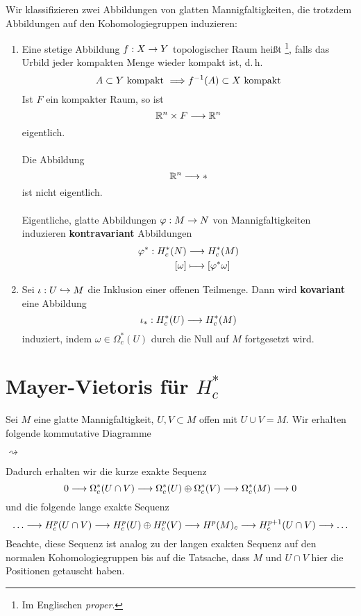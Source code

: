 \Bem{}
Wir klassifizieren zwei Abbildungen von glatten Mannigfaltigkeiten, die trotzdem Abbildungen auf den Kohomologiegruppen induzieren:
\begin{enumerate}[1)]
	\item \Def{}
	Eine stetige Abbildung $f : X \overset{}{\rightarrow} Y$ topologischer Raum heißt \footnote{Im Englischen \textit{proper}.}, falls das Urbild jeder kompakten Menge wieder kompakt ist, d.\,h.
	\[ A \subset Y \text{ kompakt } \overset{}{\Longrightarrow} f^{-1}(A)  \subset X\text{ kompakt} \]
	\Bsp{}
	Ist $F$ ein kompakter Raum, so ist
	\[ \mathbb{R}^n\times F \overset{}{\longrightarrow} \mathbb{R}^n \]
	eigentlich.\\\\
	Die Abbildung
	\[\mathbb{R}^n \overset{}{\longrightarrow} \ast \]
	ist nicht eigentlich.\\\\
	Eigentliche, glatte Abbildungen $\varphi : M\overset{}{\rightarrow} N$ von Mannigfaltigkeiten induzieren \textbf{kontravariant} Abbildungen
	\begin{align*}
	\varphi^* : H^*_c(N) & \overset{}{\longrightarrow} H^*_c(M)\\
	[\omega] & \longmapsto [\varphi^*\omega]
	\end{align*}
	\item Sei $\iota : U \overset{}{\hookrightarrow} M$ die Inklusion einer offenen Teilmenge. Dann wird \textbf{kovariant} eine Abbildung
	\[ \iota_* : H^*_c(U) \overset{}{\longrightarrow} H^*_c(M)\]
	induziert, indem $\omega \in \Omega_c^*(U)$ durch die Null auf $M$ fortgesetzt wird.
\end{enumerate}

\section{Mayer-Vietoris für $H^*_c$}
Sei $M$ eine glatte Mannigfaltigkeit, $U,V \subset M$ offen mit $U\cup V = M$. Wir erhalten folgende kommutative Diagramme
\begin{center}
	$\rightsquigarrow$
\end{center}
Dadurch erhalten wir die kurze exakte Sequenz
\[ 0 \overset{}{\longrightarrow} \Omega_c^*(U\cap V) \overset{}{\longrightarrow} \Omega_c^*(U) \oplus \Omega_c^*(V) \overset{}{\longrightarrow} \Omega_c^*(M) \overset{}{\longrightarrow} 0 \]
und die folgende lange exakte Sequenz
\[ \ldots \overset{}{\longrightarrow} H^p_c(U\cap V)  \overset{}{\longrightarrow} H_c^p(U) \oplus H_c^p(V) \overset{}{\longrightarrow} H^p(M)_c  \overset{}{\longrightarrow} H^{p+1}_c(U\cap V) \overset{}{\longrightarrow} \ldots \]
Beachte, diese Sequenz ist analog zu der langen exakten Sequenz auf den normalen Kohomologiegruppen bis auf die Tatsache, dass $M$ und $U\cap V$ hier die Positionen getauscht haben.